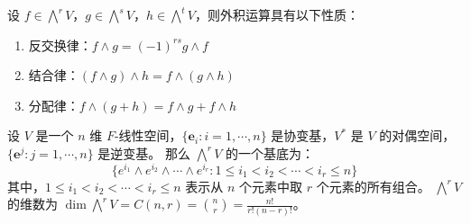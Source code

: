 \begin{proposition}[外积运算的性质]
    设 $f\in \bigwedge^rV$，$g\in \bigwedge^sV$，$h\in \bigwedge^tV$，则外积运算具有以下性质：
    \begin{enumerate}
        \item 反交换律：$f\wedge g = (-1)^{rs} g\wedge f$
        \item 结合律：$(f\wedge g)\wedge h = f\wedge (g\wedge h)$
        \item 分配律：$f\wedge (g+h) = f\wedge g + f\wedge h$
    \end{enumerate}
    \label{prop:exterior_product_property}
\end{proposition}

\begin{proposition}[外形式的基底]
    设 $V$ 是一个 $n$ 维 $F$-线性空间，$\{\mathbf{e}_i:i=1,\cdots,n\}$ 是协变基，$V^*$ 是 $V$ 的对偶空间，$\{\mathbf{e}^j:j=1,\cdots,n\}$ 是逆变基。
    那么 $\bigwedge^rV$ 的一个基底为：
    \[
        \{e^{i_1}\wedge e^{i_2}\wedge \cdots \wedge e^{i_r} : 1\leq i_1 < i_2 < \cdots < i_r \leq n\}
    \]
    其中，$1\leq i_1 < i_2 < \cdots < i_r \leq n$ 表示从 $n$ 个元素中取 $r$ 个元素的所有组合。
    $\bigwedge^rV$ 的维数为 $\dim \bigwedge^rV = C(n,r)=\binom{n}{r} = \frac{n!}{r!(n-r)!}$。
\end{proposition}


